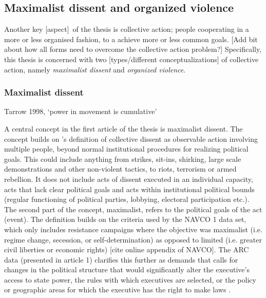 \documentclass[12pt]{article}
\begin{document}
\subsection{Maximalist dissent and organized violence}
\label{Maximalist dissent and organized violence}

Another key [aspect] of the thesis is collective action; people cooperating in a
more or less organised fashion, to a achieve more or less common goals. [Add bit
about how all forms need to overcome the collective action problem?]
Specifically, this thesis is concerned with two [types/different
conceptualizations] of collective action, namely \textit{maximalist dissent} and
\textit{organized violence}.

\subsubsection{Maximalist dissent} \label{Maximalist dissent}

Tarrow 1998, `power in movement is cumulative'

A central concept in the first article of the thesis is maximalist dissent. The
concept builds on \citet{TillyCharles1978Fmtr}'s definition of collective
dissent as observable action involving multiple people, beyond normal
institutional procedures for realizing political goals. This could include
anything from strikes, sit-ins, shirking, large scale demonstrations and other
non-violent tactics, to riots, terrorism or armed rebellion. It does not include
acts of dissent executed in an individual capacity, acts that lack clear
political goals and acts within institutional political bounds (regular
functioning of political parties, lobbying, electoral participation etc.). The
second part of the concept, maximalist, refers to the political goals of the act
(event). The definition builds on the criteria used by the NAVCO 1 data set,
which only includes resistance campaigns where the objective was maximalist
(i.e. regime change, secession, or self-determination) as opposed to limited
(i.e. greater civil liberties or economic rights) [cite online appendix of
NAVCO]. The ARC data (presented in article 1) clarifies this further as demands
that calls for changes in the political structure that would significantly alter
the executive’s access to state power, the rules with which executives are
selected, or the policy or geographic areas for which the executive has the
right to make laws \citep{Butcher_2022}.
\end{document}

